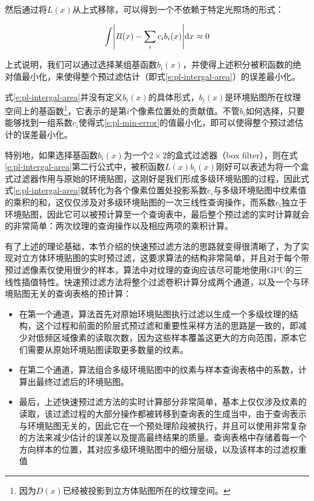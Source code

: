 \noindent 然后通过将$L(x)$从上式移除，可以得到一个不依赖于特定光照场的形式\cite{a:Cardinality-constrainedtexturefiltering}：

\begin{equation}\label{e:pl-min-error}
	\int \Biggl| B(x)- \sum_i c_i b_i(x)\Biggl| {\rm d}x \approx 0
\end{equation}

上式说明，我们可以通过选择某组基函数$b_i(x)$，并使得上述积分被积函数的绝对值最小化，来使得整个预过滤估计（即式\ref{e:pl-intergal-area}）的误差最小化。

式\ref{e:pl-intergal-area}并没有定义$b_i(x)$的具体形式，$b_i(x)$是环境贴图所在纹理空间上的基函数\footnote{因为$D(x)$已经被投影到立方体贴图所在的纹理空间。}，它表示的是第$i$个像素位置处的贡献值。不管$b_i$如何选择，只要能够找到一组系数$c_i$使得式\ref{e:pl-min-error}的值最小化，即可以使得整个预过滤估计的误差最小化。

特别地，如果选择基函数$b_i(x)$为一个$2\times 2$的盒式过滤器（box filter），则在式\ref{e:pl-intergal-area}第二行公式中，被积函数$L(x)b_i(x)$刚好可以表述为将一个盒式过滤器作用与原始的环境贴图，这刚好是我们形成多级环境贴图的过程，因此式式\ref{e:pl-intergal-area}就转化为各个像素位置处投影系数$c_i$与多级环境贴图中纹素值的乘积的和，这仅仅涉及对多级环境贴图的一次三线性查询操作，而系数$c_i$独立于环境贴图，因此它可以被预计算至一个查询表中，最后整个预过滤的实时计算就会的非常简单：两次纹理的查询操作以及相应两项的乘积计算。

有了上述的理论基础，本节介绍的快速预过滤方法\cite{a:FastFilteringofReflectionProbes}的思路就变得很清晰了，为了实现对立方体环境贴图的实时预过滤，这要求算法的结构非常简单，并且对于每个带预过滤像素仅使用很少的样本，算法中对纹理的查询应该尽可能地使用GPU的三线性插值特性。快速预过滤方法将整个过滤卷积计算分成两个通道，以及一个与环境贴图无关的查询表格的预计算：

\begin{itemize}
	\item 在第一个通道，算法首先对原始环境贴图执行过滤以生成一个多级纹理的结构，这个过程和前面的阶层式预过滤和重要性采样方法的思路是一致的，即减少对低频区域像素的读取次数，因为这些样本覆盖这更大的方向范围，原本它们需要从原始环境贴图读取更多数量的纹素。
	\item 在第二个通道，算法组合多级环境贴图中的纹素与样本查询表格中的系数，计算出最终过滤后的环境贴图。
	\item 最后，上述快速预过滤方法的实时计算部分非常简单，基本上仅仅涉及纹素的读取，该过滤过程的大部分操作都被转移到查询表的生成当中，由于查询表示与环境贴图无关的，因此它在一个预处理阶段被执行，并且可以使用非常复杂的方法来减少估计的误差以及提高最终结果的质量。查询表格中存储着每一个方向样本的位置，其对应多级环境贴图中的细分层级，以及该样本的过滤权重值
\end{itemize}

